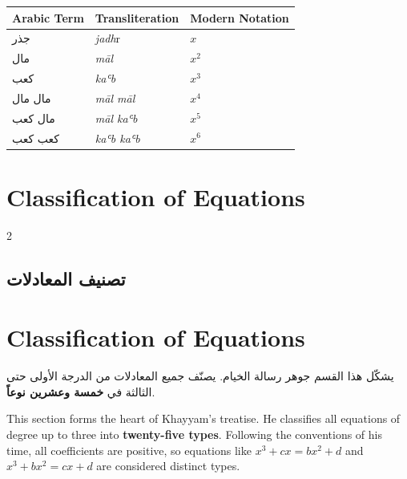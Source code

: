 \documentclass[11pt,a4paper]{book}
\begin{document}
\begin{center}
\renewcommand{\arraystretch}{1.3}
\begin{tabular}{lll}
\toprule
\textbf{Arabic Term} & \textbf{Transliteration} & \textbf{Modern Notation} \\
\midrule
\textarabic{جذر} & \textit{jadh}r & $x$ \\
\textarabic{مال} & \textit{māl} & $x^2$ \\
\textarabic{كعب} & \textit{kaʿb} & $x^3$ \\
\textarabic{مال مال} & \textit{māl māl} & $x^4$ \\
\textarabic{مال كعب} & \textit{māl kaʿb} & $x^5$ \\
\textarabic{كعب كعب} & \textit{kaʿb kaʿb} & $x^6$ \\
\bottomrule
\end{tabular}
\end{center}

\clearpage
\section{Classification of Equations}
\label{sec:classification}

\begin{paracol}{2}

\begin{Arabic}
\section*{تصنيف المعادلات}
\end{Arabic}

\switchcolumn

\section*{Classification of Equations}

\switchcolumn*

\begin{Arabic}
يشكّل هذا القسم جوهر رسالة الخيام. يصنّف جميع المعادلات من الدرجة الأولى حتى الثالثة في \textbf{خمسة وعشرين نوعاً}.
\end{Arabic}

\switchcolumn

This section forms the heart of Khayyam's treatise. He classifies all equations of degree up to three into \textbf{twenty-five types}. Following the conventions of his time, all coefficients are positive, so equations like $x^3 + cx = b x^2 + d$ and $x^3 + b x^2 = cx + d$ are considered distinct types.

\end{paracol}
\end{document}
